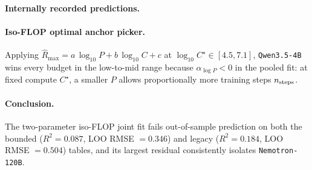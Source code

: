 \paragraph{Internally recorded predictions.}
\begin{table}[ht]
\centering\small
{}
\caption{Three internally recorded predictions P1--P3 with measured outcomes (legacy and $[0,1]$-bounded values shown).}
\end{table}

\paragraph{Iso-FLOP optimal anchor picker.}
Applying $\hat{R}_{\max}=a\,\log_{10}P + b\,\log_{10}C + c$ at $\log_{10}C^{\star}\in[4.5,7.1]$, \texttt{Qwen3.5-4B} wins every budget in the low-to-mid range because $\alpha_{\log P} < 0$ in the pooled fit: at fixed compute $C^{\star}$, a smaller $P$ allows proportionally more training steps $n_{\rm steps}$.

\paragraph{Conclusion.}
The two-parameter iso-FLOP joint fit fails out-of-sample prediction on both the bounded ($R^2=0.087$, LOO RMSE $=0.346$) and legacy ($R^2=0.184$, LOO RMSE $=0.504$) tables, and its largest residual consistently isolates \texttt{Nemotron-120B}.
